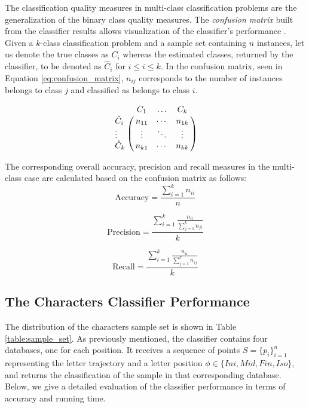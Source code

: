 \iftoggle{edit-mode}{\hspace{0pt}\marginpar{Classification quality measurements - multi-class}}{}
The classification quality measures in multi-class classification problems are the generalization of the binary class quality measures.
The \emph{confusion matrix} built from the classifier results allows visualization of the classifier's performance \cite{sokolova2009systematic, labatut2012accuracy}. 
Given a $k$-class classification problem and a sample set containing $n$ instances, let us denote the true classes as $C_i$ whereas the estimated classes, returned by the classifier, to be denoted as $\hat{C}_i$ for $i\leq i \leq k$.
In the confusion matrix, seen in Equation \ref{eq:confusion_matrix}, $n_{ij}$ corresponds to the number of instances belongs to class $j$ and classified as belongs to class $i$.

\begin{equation}
\bordermatrix{ & C_1& \ldots &C_k \cr 
  \hat{C}_i & n_{11} & \cdots & n_{1k} \cr
  \vdots    & \vdots & \ddots & \vdots \cr
  \hat{C}_k & n_{k1} & \cdots & n_{kk}}
\label{eq:confusion_matrix} 
\end{equation}

The corresponding overall accuracy, precision and recall measures in the multi-class case are calculated based on the confusion matrix as follows:
\begin{equation}
\text{Accuracy}=\frac{\sum\limits_{i=1}^{k} n_{ii}}{n}
\label{eq:accuracy}
\end{equation}

\begin{equation}
\text{Precision}=\frac{\sum\limits_{i=1}^{k} \frac{n_{ii}}{\sum_{j=1}^{k} n_{ji}}}{k}
\label{eq:percision}
\end{equation}

\begin{equation}
\text{Recall}=   \frac{\sum\limits_{i=1}^{k} \frac{n_{ii}}{\sum_{j=1}^{k} n_{ij}}}{k}
\label{eq:percision}
\end{equation}

\subsection{The Characters Classifier Performance}
\iftoggle{edit-mode}{\hspace{0pt}\marginpar{The sample set}}{}
The distribution of the characters sample set is shown in Table \ref{table:sample_set}.
As previously mentioned, the classifier contains four databases, one for each position. 
It receives a sequence of points $S=\{p_{i}\}_{i=1}^{n}$ representing the letter trajectory and a letter position $\phi \in \{Ini, Mid, Fin, Iso\}$, and returns the classification of the sample in that corresponding database.
Below, we give a detailed evaluation of the classifier performance in terms of accuracy and running time.


